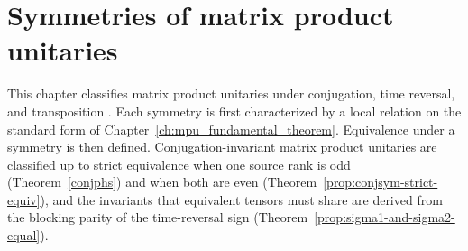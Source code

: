 \chapter{Symmetries of matrix product unitaries}
\label{ch:mpu_symmetries}

This chapter classifies matrix product unitaries under conjugation, time
reversal, and transposition \cite{Cirac2017MPU}. Each symmetry is first
characterized by a local relation on the standard form of
Chapter~\ref{ch:mpu_fundamental_theorem}. Equivalence under a symmetry is then
defined. Conjugation-invariant matrix product unitaries are classified up to
strict equivalence when one source rank is odd (Theorem~\ref{conjphs}) and
when both are even (Theorem~\ref{prop:conjsym-strict-equiv}), and the
invariants that equivalent tensors must share are derived from the blocking
parity of the time-reversal sign (Theorem~\ref{prop:sigma1-and-sigma2-equal}).



